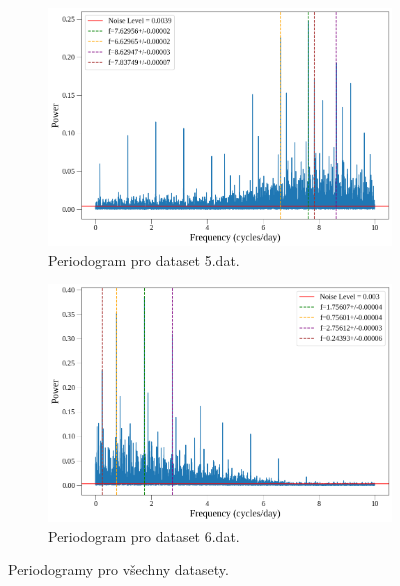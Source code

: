 \documentclass[a4paper,11pt,twocolumn]{article}
\begin{document}
\begin{figure}
\begin{subfigure}[t]{0.48\textwidth}
                    \centering
                    \includegraphics[width=\textwidth]{5_per.png}
                    \caption{Periodogram pro dataset 5.dat.}
                    \label{fig:5_per}
                \end{subfigure}
                \hfill
                \begin{subfigure}[t]{0.48\textwidth}
                    \centering
                    \includegraphics[width=\textwidth]{6_per.png}
                    \caption{Periodogram pro dataset 6.dat.}
                    \label{fig:6_per}
                \end{subfigure}
                \caption{Periodogramy pro všechny datasety.}
                \label{fig:all_per}
            \end{figure}

        \newpage
\end{document}
